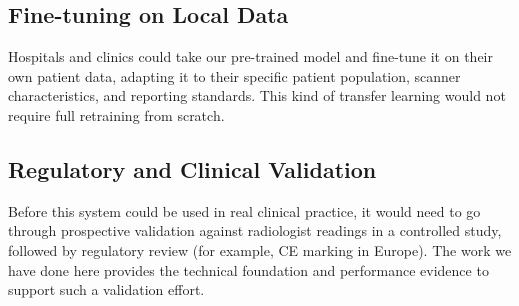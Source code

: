 \documentclass[12pt]{report}
\begin{document}
\subsection{Fine-tuning on Local Data}
Hospitals and clinics could take our pre-trained model and fine-tune it on their own patient data, adapting it to their specific patient population, scanner characteristics, and reporting standards. This kind of transfer learning would not require full retraining from scratch.

\subsection{Regulatory and Clinical Validation}
Before this system could be used in real clinical practice, it would need to go through prospective validation against radiologist readings in a controlled study, followed by regulatory review (for example, CE marking in Europe). The work we have done here provides the technical foundation and performance evidence to support such a validation effort.
\end{document}

